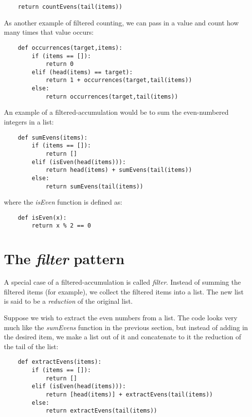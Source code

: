 \begin{verbatim}
    return countEvens(tail(items))
\end{verbatim}

As another example of filtered counting, we can
pass in a value and count how many times that
value occurs:

\begin{verbatim}
    def occurrences(target,items):
        if (items == []):
            return 0
        elif (head(items) == target):
            return 1 + occurrences(target,tail(items))
        else:
            return occurrences(target,tail(items))
\end{verbatim}

An example of a filtered-accumulation would be 
to sum the even-numbered integers in a list:

\begin{verbatim}
    def sumEvens(items):
        if (items == []):
            return []
        elif (isEven(head(items))):
            return head(items) + sumEvens(tail(items))
        else:
            return sumEvens(tail(items))
\end{verbatim}

where the {\it isEven} function is defined as:

\begin{verbatim}
    def isEven(x):
        return x % 2 == 0
\end{verbatim}

\section{The {\it filter} pattern}

A special case of a filtered-accumulation is called {\it filter}.
Instead of summing the filtered items (for example), we collect
the filtered items into a list. The new list is said to be
a {\it reduction} of the original list.

Suppose we wish to extract the even numbers from a list. The
code looks very much like the {\it sumEvens} function in the previous
section, but instead of adding in the desired item,
we make a list out of it and concatenate to it the
reduction of the tail of the list:

\begin{verbatim}
    def extractEvens(items):
        if (items == []):
            return []
        elif (isEven(head(items))):
            return [head(items)] + extractEvens(tail(items))
        else:
            return extractEvens(tail(items))
\end{verbatim}

